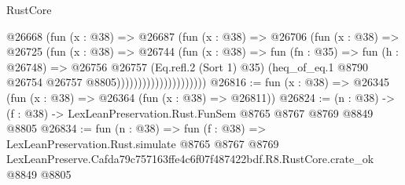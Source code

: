 \begin{lexlean}{RustCore}
\begin{coremodule}
                                @26668
                                  (fun (x : @38) =>
                                  @26687
                                    (fun (x : @38) =>
                                    @26706
                                      (fun (x : @38) =>
                                      @26725
                                        (fun (x : @38) =>
                                        @26744
                                          (fun (x : @38) =>
                                          fun (fn : @35) =>
                                          fun (h : @26748) =>
                                          @26756
                                            @26757
                                            (Eq.refl.{2} (Sort 1) @35)
                                            (heq_of_eq.{1}
                                              @8790
                                              @26754
                                              @26757
                                              @8805)))))))))))))))))))))
@26816 := fun (x : @38) => @26345 (fun (x : @38) => @26364 (fun (x : @38) => @26811))
@26824 := (n : @38) -> (f : @38) -> LexLeanPreservation.Rust.FunSem @8765 @8767 @8769 @8849 @8805
@26834 := fun (n : @38) =>
  fun (f : @38) =>
  LexLeanPreservation.Rust.simulate
    @8765
    @8767
    @8769
    LexLeanPreserve.Cafda79c757163ffe4c6f07f487422bdf.R8.RustCore.crate_ok
    @8849
    @8805
\end{coremodule}
\end{lexlean}
